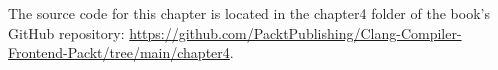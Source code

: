 The source code for this chapter is located in the chapter4 folder of the book’s GitHub repository: \url{https://github.com/PacktPublishing/Clang-Compiler-Frontend-Packt/tree/main/chapter4}.